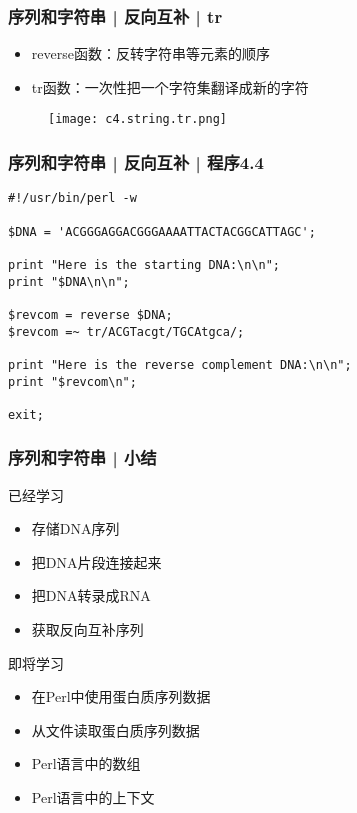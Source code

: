 \begin{frame}
  \frametitle{序列和字符串 | 反向互补 | \alert{tr}}
  \begin{itemize}
    \item reverse函数：反转字符串等元素的顺序
    \item tr函数：一次性把一个字符集翻译成新的字符
  \end{itemize}
  \begin{figure}
    \centering
    \texttt{[image: c4.string.tr.png]}
  \end{figure}
\end{frame}

\begin{frame}[fragile]
  \frametitle{序列和字符串 | 反向互补 | \alert{程序4.4}}
\begin{lstlisting}
#!/usr/bin/perl -w

$DNA = 'ACGGGAGGACGGGAAAATTACTACGGCATTAGC';

print "Here is the starting DNA:\n\n";
print "$DNA\n\n";

$revcom = reverse $DNA;
$revcom =~ tr/ACGTacgt/TGCAtgca/;

print "Here is the reverse complement DNA:\n\n";
print "$revcom\n";

exit;
\end{lstlisting}
\end{frame}

\begin{frame}
  \frametitle{序列和字符串 | 小结}
  \begin{block}{已经学习}
    \begin{itemize}
      \item 存储DNA序列
      \item 把DNA片段连接起来
      \item 把DNA转录成RNA
      \item 获取反向互补序列
    \end{itemize}
  \end{block}
  \pause
  \begin{block}{即将学习}
    \begin{itemize}
      \item 在Perl中使用蛋白质序列数据
      \item 从文件读取蛋白质序列数据
      \item Perl语言中的数组
      \item Perl语言中的上下文
    \end{itemize}
  \end{block}
\end{frame}

